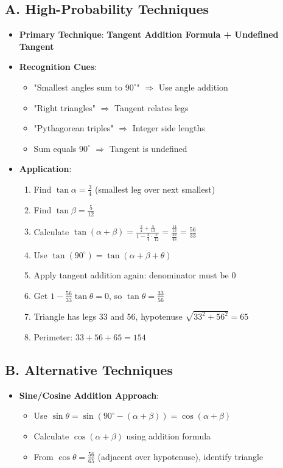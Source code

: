 \documentclass[12pt]{article}
\begin{document}
\begin{techniquesbox}
\subsection*{A. High-Probability Techniques}
\begin{itemize}[leftmargin=*]
    \item \textbf{Primary Technique}: \textbf{Tangent Addition Formula + Undefined Tangent}
    
    \item \textbf{Recognition Cues}: 
    \begin{itemize}
        \item "Smallest angles sum to $90^{\circ}$" $\Rightarrow$ Use angle addition
        \item "Right triangles" $\Rightarrow$ Tangent relates legs
        \item "Pythagorean triples" $\Rightarrow$ Integer side lengths
        \item Sum equals $90^{\circ}$ $\Rightarrow$ Tangent is undefined
    \end{itemize}
    
    \item \textbf{Application}:
    \begin{enumerate}
        \item Find $\tan\alpha = \frac{3}{4}$ (smallest leg over next smallest)
        \item Find $\tan\beta = \frac{5}{12}$
        \item Calculate $\tan(\alpha + \beta) = \frac{\frac{3}{4} + \frac{5}{12}}{1 - \frac{3}{4} \cdot \frac{5}{12}} = \frac{\frac{14}{12}}{\frac{33}{48}} = \frac{56}{33}$
        \item Use $\tan(90^{\circ}) = \tan(\alpha + \beta + \theta)$
        \item Apply tangent addition again: denominator must be 0
        \item Get $1 - \frac{56}{33} \tan\theta = 0$, so $\tan\theta = \frac{33}{56}$
        \item Triangle has legs 33 and 56, hypotenuse $\sqrt{33^2 + 56^2} = 65$
        \item Perimeter: $33 + 56 + 65 = 154$
    \end{enumerate}
\end{itemize}

\subsection*{B. Alternative Techniques}
\begin{itemize}[leftmargin=*]
    \item \textbf{Sine/Cosine Addition Approach}:
    \begin{itemize}
        \item Use $\sin\theta = \sin(90^{\circ} - (\alpha + \beta)) = \cos(\alpha + \beta)$
        \item Calculate $\cos(\alpha + \beta)$ using addition formula
        \item From $\cos\theta = \frac{56}{65}$ (adjacent over hypotenuse), identify triangle
    \end{itemize}
    

\end{itemize}
\end{techniquesbox}
\end{document}
